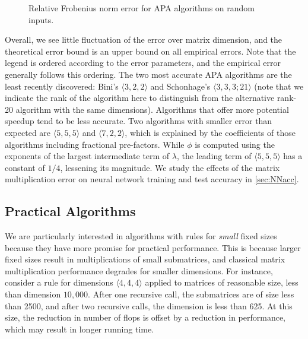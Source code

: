 \documentclass[sigconf,review,anonymous]{acmart}
\newcommand{\dims}[1]{\langle #1 \rangle}
\newcommand{\datafile}{}
\begin{document}
\begin{figure}
\centering
\renewcommand{\datafile}{data/matmul_acc.dat}

\caption{Relative Frobenius norm error for APA algorithms on random inputs.}
\label{fig:accuracy}
\end{figure}

Overall, we see little fluctuation of the error over matrix dimension, and the theoretical error bound is an upper bound on all empirical errors.
Note that the legend is ordered according to the error parameters, and the empirical error generally follows this ordering.
The two most accurate APA algorithms are the least recently discovered: Bini's $\dims{3,2,2}$ and Schonhage's $\dims{3,3,3;21}$ (note that we indicate the rank of the algorithm here to distinguish from the alternative rank-20 algorithm with the same dimensions).
Algorithms that offer more potential speedup tend to be less accurate.
Two algorithms with smaller error than expected are $\dims{5,5,5}$ and $\dims{7,2,2}$, which is explained by the coefficients of those algorithms including fractional pre-factors.
While $\phi$ is computed using the exponents of the largest intermediate term of $\lambda$, the leading term of $\dims{5,5,5}$ has a constant of $1/4$, lessening its magnitude. 
We study the effects of the matrix multiplication error on neural network training and test accuracy in \cref{sec:NNacc}.

\subsection{Practical Algorithms}

We are particularly interested in algorithms with rules for \emph{small} fixed sizes because they have more promise for practical performance.
This is because larger fixed sizes result in multiplications of small submatrices, and classical matrix multiplication performance degrades for smaller dimensions.
For instance, consider a rule for dimensions $\dims{4,4,4}$ applied to matrices of reasonable size, less than dimension $10{,}000$.
After one recursive call, the submatrices are of size less than 2500, and after two recursive calls, the dimension is less than 625.
At this size, the reduction in number of flops is offset by a reduction in performance, which may result in longer running time.
\end{document}
